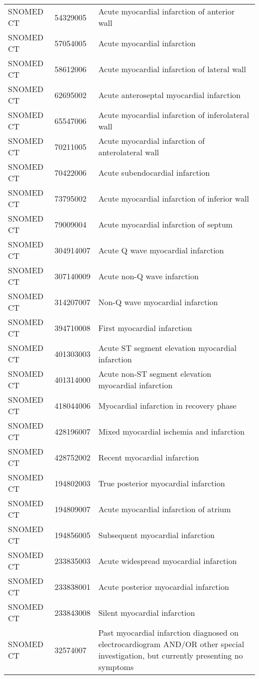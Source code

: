 \begin{longtable}{p{}p{}p{}}
  SNOMED CT & 54329005 & Acute myocardial infarction of anterior wall \\ 
  SNOMED CT & 57054005 & Acute myocardial infarction \\ 
  SNOMED CT & 58612006 & Acute myocardial infarction of lateral wall \\ 
  SNOMED CT & 62695002 & Acute anteroseptal myocardial infarction \\ 
  SNOMED CT & 65547006 & Acute myocardial infarction of inferolateral wall \\ 
  SNOMED CT & 70211005 & Acute myocardial infarction of anterolateral wall \\ 
  SNOMED CT & 70422006 & Acute subendocardial infarction \\ 
  SNOMED CT & 73795002 & Acute myocardial infarction of inferior wall \\ 
  SNOMED CT & 79009004 & Acute myocardial infarction of septum \\ 
  SNOMED CT & 304914007 & Acute Q wave myocardial infarction \\ 
  SNOMED CT & 307140009 & Acute non-Q wave infarction \\ 
  SNOMED CT & 314207007 & Non-Q wave myocardial infarction \\ 
  SNOMED CT & 394710008 & First myocardial infarction \\ 
  SNOMED CT & 401303003 & Acute ST segment elevation myocardial infarction \\ 
  SNOMED CT & 401314000 & Acute non-ST segment elevation myocardial infarction \\ 
  SNOMED CT & 418044006 & Myocardial infarction in recovery phase \\ 
  SNOMED CT & 428196007 & Mixed myocardial ischemia and infarction \\ 
  SNOMED CT & 428752002 & Recent myocardial infarction \\ 
  SNOMED CT & 194802003 & True posterior myocardial infarction \\ 
  SNOMED CT & 194809007 & Acute myocardial infarction of atrium \\ 
  SNOMED CT & 194856005 & Subsequent myocardial infarction \\ 
  SNOMED CT & 233835003 & Acute widespread myocardial infarction \\ 
  SNOMED CT & 233838001 & Acute posterior myocardial infarction \\ 
  SNOMED CT & 233843008 & Silent myocardial infarction \\ 
  SNOMED CT & 32574007 & Past myocardial infarction diagnosed on electrocardiogram AND/OR other special investigation, but currently presenting no symptoms \\ 

\end{longtable}
